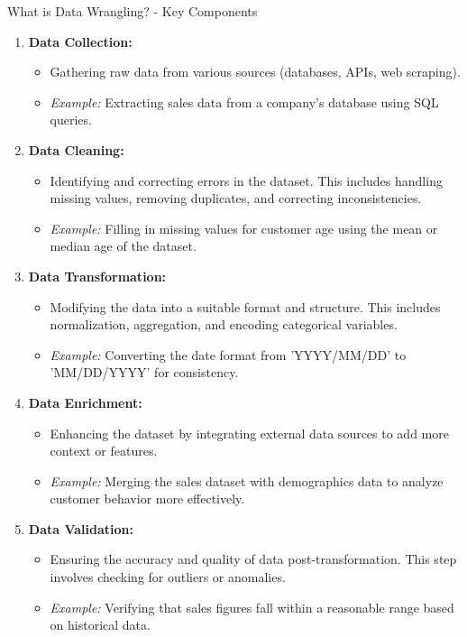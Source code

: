 \documentclass[aspectratio=169]{beamer}
\begin{document}
\begin{frame}[fragile]{What is Data Wrangling? - Key Components}
    \begin{enumerate}
        \item \textbf{Data Collection:}
        \begin{itemize}
            \item Gathering raw data from various sources (databases, APIs, web scraping).
            \item \textit{Example:} Extracting sales data from a company's database using SQL queries.
        \end{itemize}
        
        \item \textbf{Data Cleaning:}
        \begin{itemize}
            \item Identifying and correcting errors in the dataset. This includes handling missing values, removing duplicates, and correcting inconsistencies.
            \item \textit{Example:} Filling in missing values for customer age using the mean or median age of the dataset.
        \end{itemize}

        \item \textbf{Data Transformation:}
        \begin{itemize}
            \item Modifying the data into a suitable format and structure. This includes normalization, aggregation, and encoding categorical variables.
            \item \textit{Example:} Converting the date format from 'YYYY/MM/DD' to 'MM/DD/YYYY' for consistency.
        \end{itemize}
        
        \item \textbf{Data Enrichment:}
        \begin{itemize}
            \item Enhancing the dataset by integrating external data sources to add more context or features.
            \item \textit{Example:} Merging the sales dataset with demographics data to analyze customer behavior more effectively.
        \end{itemize}

        \item \textbf{Data Validation:}
        \begin{itemize}
            \item Ensuring the accuracy and quality of data post-transformation. This step involves checking for outliers or anomalies.
            \item \textit{Example:} Verifying that sales figures fall within a reasonable range based on historical data.
        \end{itemize}
    \end{enumerate}
\end{frame}
\end{document}
